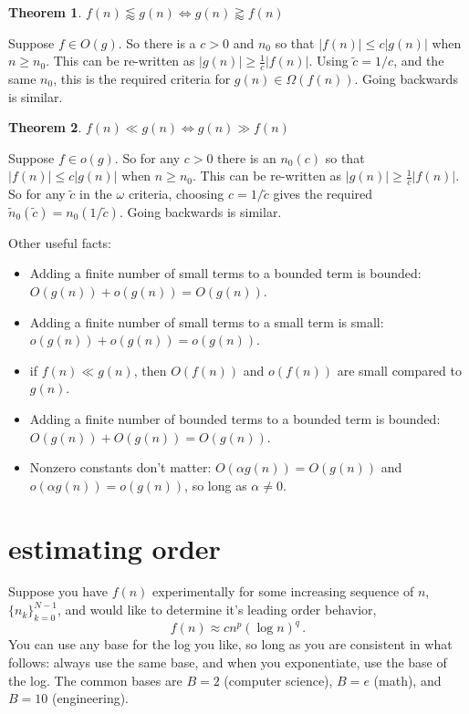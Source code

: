 \documentclass{tufte-handout}
\theoremstyle{definition}
\theoremstyle{example}
\theoremstyle{theorem}
\newtheorem{theorem}{Theorem}
\begin{document}
\begin{theorem}{$f(n) \lessapprox g(n) \iff g(n) \gtrapprox f(n)$}  

Suppose $f \in O(g)$.  So there is a $c > 0$ and $n_0$ so that $|f(n)| \leq c |g(n)|$ when $n \geq n_0$.  This can be re-written as $|g(n)| \geq \frac{1}{c} |f(n)|$.  Using $\tilde{c}=1/c$, and the same $n_0$, this is the required criteria for $g(n) \in \Omega(f(n))$. Going backwards is similar.
\end{theorem}

\begin{theorem}{$f(n) \ll g(n) \iff g(n) \gg f(n)$}  

Suppose $f \in o(g)$.  So for any $c > 0$ there is an $n_0(c)$ so that $|f(n)| \leq c |g(n)|$ when $n \geq n_0$.  This can be re-written as $|g(n)| \geq \frac{1}{c} |f(n)|$.  So for any $\tilde{c}$ in the $\omega$ criteria, choosing $c=1/\tilde{c}$ gives the required $\tilde{n}_0(\tilde{c})=n_0(1/\tilde{c})$. Going backwards is similar.
\end{theorem}

Other useful facts:
\begin{itemize}
    \item Adding a finite number of small terms to a bounded term is bounded: $O(g(n)) + o(g(n)) = O(g(n))$.
    \item Adding a finite number of small terms to a small term is small: $o(g(n)) + o(g(n)) = o(g(n))$.
    \item if $f(n) \ll g(n)$, then $O(f(n))$ and $o(f(n))$ are small compared to $g(n)$.
    \item Adding a finite number of bounded terms to a bounded term is bounded: $O(g(n)) + O(g(n)) = O(g(n))$.
    \item Nonzero constants don't matter: $O(\alpha g(n))=O(g(n))$ and $o(\alpha g(n))=o(g(n))$, so long as $\alpha \neq 0$.
\end{itemize}

\section{estimating order}

Suppose you have $f(n)$ experimentally for some increasing sequence of $n$, $\{n_k\}_{k=0}^{N-1}$, and would like to determine it's leading order behavior,
\begin{equation}
    f(n) \approx c n^p (\log n)^q \,.
\end{equation}
You can use any base for the log you like, so long as you are consistent in what follows: always use the same base, and when you exponentiate, use the base of the log.  The common bases are $B=2$ (computer science), $B=e$ (math), and $B=10$ (engineering).
\end{document}

